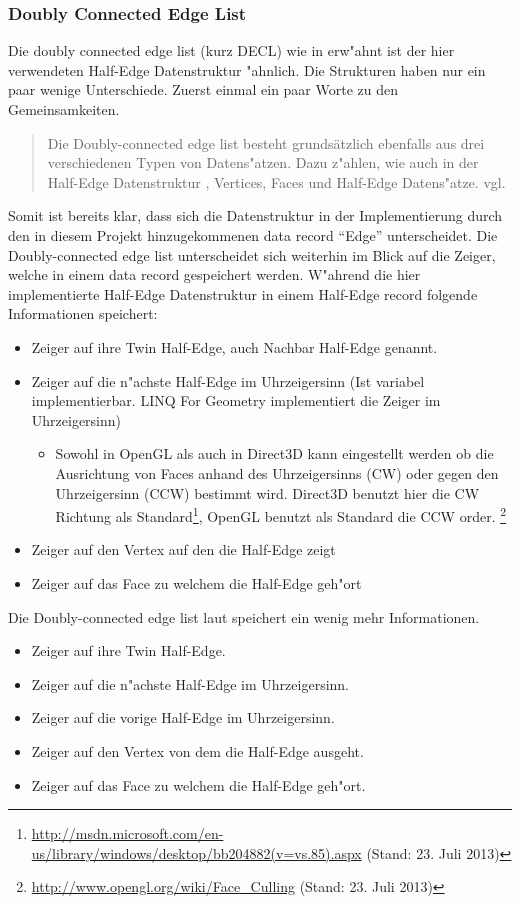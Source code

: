 \documentclass[pagesize, paper=a4, fontsize=12pt,titlepage=true, headings=small, headnosepline, abstractoff, liststotoc, nochapterprefix, plainheadsepline]{scrreprt}
\newcommand{\LFGS}{LINQ For Geometry }
\newcommand{\HES}{Half-Edge Datenstruktur }
\begin{document}
			\subsubsection {Doubly Connected Edge List}
				Die doubly connected edge list (kurz DECL) wie in \cite{vanMarkdeBerg.2008} erw"ahnt ist der hier verwendeten \HES "ahnlich. Die Strukturen haben nur ein paar wenige Unterschiede. Zuerst einmal ein paar Worte zu den Gemeinsamkeiten. \begin{quote}Die Doubly-connected edge list besteht grunds{\"a}tzlich ebenfalls aus drei verschiedenen Typen von Datens"atzen. Dazu z"ahlen, wie auch in der \HES, Vertices, Faces und Half-Edge Datens"atze. vgl. \cite[S.~31]{vanMarkdeBerg.2008}\end{quote}

Somit ist bereits klar, dass sich die Datenstruktur in der Implementierung durch den in diesem Projekt hinzugekommenen data record "`Edge"' unterscheidet. Die Doubly-connected edge list unterscheidet sich weiterhin im Blick auf die Zeiger, welche in einem data record gespeichert werden. W"ahrend die hier implementierte \HES in einem Half-Edge record folgende Informationen speichert:
\begin{itemize}
\item Zeiger auf ihre Twin Half-Edge, auch Nachbar Half-Edge genannt.
\item Zeiger auf die n"achste Half-Edge im Uhrzeigersinn (Ist variabel implementierbar. \LFGS implementiert die Zeiger im Uhrzeigersinn)
\begin{itemize}
\item Sowohl in OpenGL als auch in Direct3D kann eingestellt werden ob die Ausrichtung von Faces anhand des Uhrzeigersinns (CW) oder gegen den Uhrzeigersinn (CCW) bestimmt wird. Direct3D benutzt hier die CW Richtung als Standard\footnote{\url{http://msdn.microsoft.com/en-us/library/windows/desktop/bb204882(v=vs.85).aspx} (Stand: 23. Juli 2013)}, OpenGL benutzt als Standard die CCW order. \footnote{\url{http://www.opengl.org/wiki/Face_Culling} (Stand: 23. Juli 2013)}
\end{itemize}
\item Zeiger auf den Vertex auf den die Half-Edge zeigt
\item Zeiger auf das Face zu welchem die Half-Edge geh"ort
\end{itemize}

Die Doubly-connected edge list laut \cite{vanMarkdeBerg.2008} speichert ein wenig mehr Informationen.
\begin{itemize}
\item Zeiger auf ihre Twin Half-Edge.
\item Zeiger auf die n"achste Half-Edge im Uhrzeigersinn.
\item Zeiger auf die vorige Half-Edge im Uhrzeigersinn.
\item Zeiger auf den Vertex von dem die Half-Edge ausgeht.
\item Zeiger auf das Face zu welchem die Half-Edge geh"ort.
\end{itemize}
\end{document}
